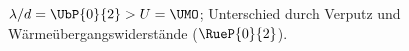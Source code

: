 $\lambda/d = \UbP{0}{2} > U = \UMO$; Unterschied durch Verputz und Wärmeübergangswiderstände ($\RueP{0}{2}$).

